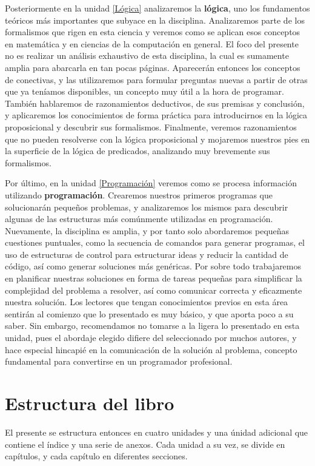 Posteriormente en la unidad \ref{Lógica} analizaremos la \textbf{lógica}, uno los
fundamentos teóricos más importantes que subyace en la disciplina. Analizaremos
parte de los formalismos que rigen en esta ciencia y veremos como se aplican
esos conceptos en matemática y en ciencias de la computación en general. El foco
del presente no es realizar un análisis exhaustivo de esta disciplina, la cual
es sumamente amplia para abarcarla en tan pocas páginas. Aparecerán entonces
los conceptos de conectivas, y las utilizaremos para formular preguntas nuevas a
partir de otras que ya teníamos disponibles, un concepto muy útil a la hora
de programar. También hablaremos de razonamientos deductivos, de sus premisas y
conclusión, y aplicaremos los conocimientos de forma práctica para introducirnos
en la lógica proposicional y descubrir sus formalismos. Finalmente, veremos
razonamientos que no pueden resolverse con la lógica proposicional y mojaremos
nuestros pies en la superficie de la lógica de predicados, analizando muy brevemente
sus formalismos.

Por último, en la unidad \ref{Programación} veremos como se procesa información utilizando
\textbf{programación}. Crearemos nuestros primeros programas que solucionarán
pequeños problemas, y analizaremos los mismos para descubrir algunas de las
estructuras más comúnmente utilizadas en programación. Nuevamente, la disciplina
es amplia, y por tanto solo abordaremos pequeñas cuestiones puntuales, como la
secuencia de comandos para generar programas, el uso de estructuras de control
para estructurar ideas y reducir la cantidad de código, así como generar
soluciones más genéricas. Por sobre todo trabajaremos en planificar nuestras
soluciones en forma de tareas pequeñas para simplificar la complejidad del
problema a resolver, así como comunicar correcta y eficazmente nuestra solución.
Los lectores que tengan conocimientos previos en esta área sentirán al comienzo
que lo presentado es muy básico, y que aporta poco a su saber. Sin embargo,
recomendamos no tomarse a la ligera lo presentado en esta unidad, pues el
abordaje elegido difiere del seleccionado por muchos autores, y hace especial
hincapié en la comunicación de la solución al problema, concepto fundamental
para convertirse en un programador profesional.

\section*{Estructura del libro}

El presente se estructura entonces en cuatro unidades y una únidad adicional
que contiene el índice y una serie de anexos. Cada unidad a su vez, se
divide en capítulos, y cada capítulo en diferentes secciones.

